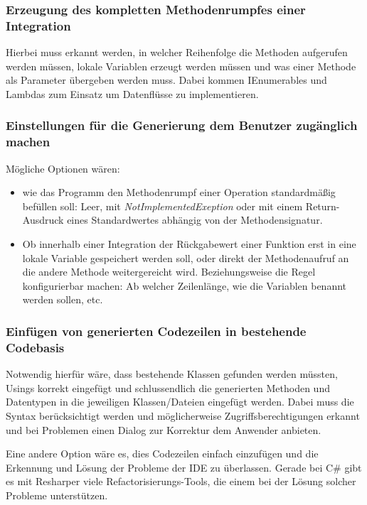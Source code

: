 \subsubsection{Erzeugung des kompletten Methodenrumpfes einer Integration}

Hierbei muss erkannt werden, in welcher Reihenfolge die Methoden aufgerufen
werden müssen, lokale Variablen erzeugt werden müssen und was einer Methode als Parameter
übergeben werden muss. Dabei kommen IEnumerables und Lambdas zum Einsatz um
Datenflüsse zu implementieren.

\subsubsection{Einstellungen für die Generierung dem Benutzer zugänglich machen
}
Mögliche Optionen wären:
\begin{itemize}
\item wie das Programm den Methodenrumpf einer Operation
standardmäßig befüllen soll: Leer, mit \textit{NotImplementedExeption} oder mit einem
Return-Ausdruck eines Standardwertes abhängig von der Methodensignatur.
\end{itemize}
\begin{itemize}
\item Ob innerhalb einer Integration der Rückgabewert einer Funktion erst in eine
lokale Variable gespeichert werden soll, oder direkt der Methodenaufruf an die
andere Methode weitergereicht wird. Beziehungsweise die Regel konfigurierbar
machen: Ab welcher Zeilenlänge, wie die Variablen benannt werden sollen, etc.
\end{itemize}

\subsubsection{Einfügen von generierten Codezeilen in bestehende Codebasis}

Notwendig hierfür wäre, dass bestehende Klassen gefunden werden müssten, Usings korrekt
eingefügt und schlussendlich die generierten Methoden und Datentypen in die
jeweiligen Klassen/Dateien eingefügt werden. Dabei muss die Syntax
berücksichtigt werden und möglicherweise Zugriffsberechtigungen erkannt und bei
Problemen einen Dialog zur Korrektur dem Anwender anbieten. 
 
Eine andere Option wäre es, dies Codezeilen einfach einzufügen und die Erkennung und Lösung der Probleme der IDE zu überlassen. Gerade bei C\# gibt es mit Resharper viele
Refactorisierungs-Tools, die einem bei der Lösung solcher Probleme unterstützen.




